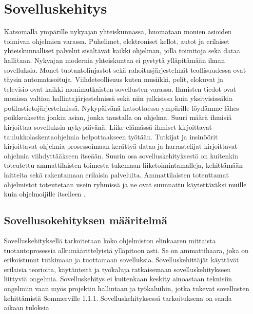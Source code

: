 \documentclass[utf8]{gradu3}
\begin{document}
\chapter{Sovelluskehitys}

Katsomalla ympärille nykyajan yhteiskunnassa, huomataan monien asioiden toimivan ohjelmien varassa. Puhelimet, elektroniset kellot, autot ja erilaiset yhteiskunnalliset palvelut sisältävät kaikki ohjelman, jolla toimitoja sekä dataa hallitaan. Nykyajan modernia yhteiskuntaa ei pystytä ylläpitämään ilman sovelluksia. Monet tuotantolinjastot sekä rahoitusjärjestelmät teollisuudessa ovat täysin automatisoituja. Viihdeteollisuus kuten musiikki, pelit, elokuvat ja televisio ovat kaikki monimutkaisten sovellusten varassa. Ihmisten tiedot ovat monissa valtion hallintajärjestelmissä sekä niin julkisissa kuin yksityisissäkin potilastietojärjestelmissä. Nykypäivänä katsottaessa ympärille löydämme lähes poikkeuksetta jonkin asian, jonka taustalla on ohjelma. Suuri määrä ihmisiä kirjoittaa sovelluksia nykypäivänä. Liike-elämässä ihmiset kirjoittavat taulukkolaskentaohjelmia helpottaakseen työtään. Tutkijat ja insinöörit kirjoittavat ohjelmia prosessoimaan kerättyä dataa ja harrastelijat kirjoittavat ohjelmia viihdyttääkseen itseään. Suurin osa sovelluskehityksestä on kuitenkin toteutettu ammattilaisten toimesta tukemaan liiketoimintamalleja, kehittämään laitteita sekä rakentamaan erilaisia palveluita. Ammattilaisten toteuttamat ohjelmistot toteutetaan usein ryhmissä ja ne ovat suunnattu käytettäväksi muille kuin ohjelmoijille itselleen \parencite{Sommerville}.

\section{Sovellusokehityksen määritelmä}
Sovelluskehityksellä tarkoitetaan koko ohjelmiston elinkaaren mittaista tuotantoprosessia alkumäärittelyistä ylläpitoon asti. Se on ammattihaara, joka on erikoistunut tutkimaan ja tuottamaan sovelluksia. Sovelluskehittäjät käyttävät erilaisia teorioita, käytänteitä ja työkaluja ratkaisemaan sovelluskehitykseen liittyviä ongelmia. Sovelluskehitys ei kuitenkaan keskity ainoastaan teknisiin ongelmiin vaan myös projektin hallintaan ja työkaluihin, jotka tukevat sovellusten kehittämistä {Sommerville 1.1.1}. Sovelluskehityksessä tarkoituksena on saada aikaan tuloksia 
\end{document}
